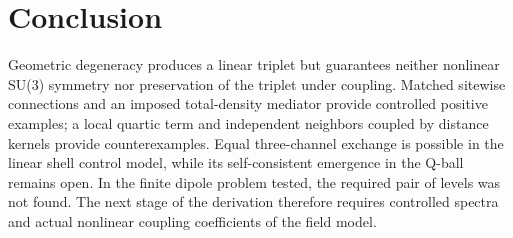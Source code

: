\documentclass[a4paper,11pt]{article}
\begin{document}
\section{Conclusion}\label{sec:conclusion}
Geometric degeneracy produces a linear triplet but guarantees neither nonlinear SU(3) symmetry nor preservation of the triplet under coupling. Matched sitewise connections and an imposed total-density mediator provide controlled positive examples; a local quartic term and independent neighbors coupled by distance kernels provide counterexamples. Equal three-channel exchange is possible in the linear shell control model, while its self-consistent emergence in the Q-ball remains open. In the finite dipole problem tested, the required pair of levels was not found. The next stage of the derivation therefore requires controlled spectra and actual nonlinear coupling coefficients of the field model.
\end{document}
